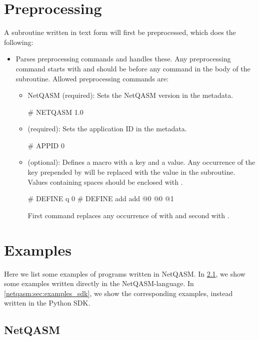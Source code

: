 \section{Preprocessing}
A subroutine written in text form will first be preprocessed, which does the following:
\begin{itemize}
  \item Parses preprocessing commands and handles these.
        Any preprocessing command starts with \nq{#} and should be before any command in the body of the subroutine.
        Allowed preprocessing commands are:
        \begin{itemize}
          \item \ac{NetQASM} (required): Sets the \ac{NetQASM} version in the metadata.
                \begin{nqcode}
# NETQASM 1.0\end{nqcode}
          \item {} (required): Sets the application ID in the metadata.
                \begin{nqcode}
# APPID 0\end{nqcode}
          \item {} (optional): Defines a macro with a key and a value.
                Any occurrence of the key prepended by \nq{\$} will be replaced with the value in the subroutine.
                Values containing spaces should be enclosed with \nq{\{\}}.

                \begin{nqcode}
# DEFINE q 0
# DEFINE add {add @0 @0 @1}\end{nqcode}
                First command replaces any occurrence of  with  and second  with .
        \end{itemize}
\end{itemize}


\section{Examples}
Here we list some examples of programs written in \ac{NetQASM}.
In \cref{netqasm:sec:examples_netqasm}, we show some examples written directly in the \ac{NetQASM}-language.
In \cref{netqasm:sec:examples_sdk}, we show the corresponding examples, instead written in the Python SDK.

\subsection{NetQASM}
\label{netqasm:sec:examples_netqasm}

